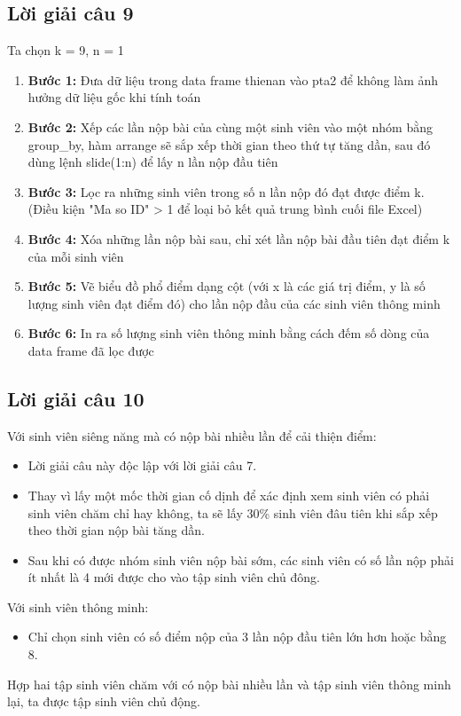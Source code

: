 \documentclass[a4paper]{article}
\theoremstyle{definition}
\begin{document}
\subsection{Lời giải câu 9}
 Ta chọn k = 9, n = 1
\begin{enumerate}
    \item \textbf{Bước 1:} Đưa dữ liệu trong data frame thienan vào pta2 để không làm ảnh hưởng dữ liệu gốc khi tính toán
    \item \textbf{Bước 2:} Xếp các lần nộp bài của cùng một sinh viên vào một nhóm bằng group\_by, hàm arrange sẽ sắp xếp thời gian theo thứ tự tăng dần, sau đó dùng lệnh slide(1:n) để lấy n lần nộp đầu tiên
    \item \textbf{Bước 3:} Lọc ra những sinh viên trong số n lần nộp đó đạt được điểm k. (Điều kiện "Ma so ID" > 1 để loại bỏ kết quả trung bình cuối file Excel)
    \item \textbf{Bước 4:} Xóa những lần nộp bài sau, chỉ xét lần nộp bài đầu tiên đạt điểm k của mỗi sinh viên
    \item \textbf{Bước 5:} Vẽ biểu đồ phổ điểm dạng cột (với x là các giá trị điểm, y là số lượng sinh viên đạt điểm đó) cho lần nộp đầu của các sinh viên thông minh
    \item \textbf{Bước 6:} In ra số lượng sinh viên thông minh bằng cách đếm số dòng của data frame đã lọc được
\end{enumerate}
\subsection{Lời giải câu 10}
Với sinh viên siêng năng mà có nộp bài nhiều
lần để cải thiện điểm:
\begin{itemize}
    \item Lời giải câu  này độc lập với lời giải câu 7.
    \item Thay vì  lấy một mốc thời gian cố dịnh để xác định xem sinh viên có phải sinh viên chăm chỉ hay không, ta sẽ lấy 30\% sinh viên đâu tiên khi sắp xếp theo thời gian nộp bài tăng dần.
    \item Sau khi có được nhóm sinh viên nộp bài sớm, các sinh viên có số lần nộp phải ít nhất là 4 mới được cho vào tập sinh viên chủ đông.
\end{itemize}
Với sinh viên thông minh:
\begin{itemize}
    \item Chỉ chọn sinh viên có số điểm nộp của 3 lần nộp đầu tiên lớn hơn hoặc bằng 8.
\end{itemize}
Hợp hai tập sinh viên chăm với có nộp bài nhiều lần và tập sinh viên thông minh lại, ta được tập sinh viên chủ động.
\end{document}

